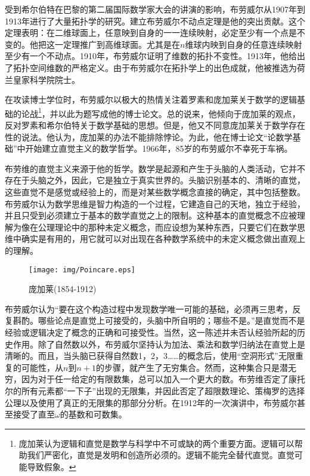 \documentclass{article}
\begin{document}
受到希尔伯特在巴黎的第二届国际数学家大会的讲演的影响，布劳威尔从1907年到1913年进行了大量拓扑学的研究。建立布劳威尔不动点定理是他的突出贡献。这个定理表明：在二维球面上，任意映到自身的一一连续映射，必定至少有一个点是不变的。他把这一定理推广到高维球面。尤其是在$n$维球内映到自身的任意连续映射至少有一个不动点。1910年，布劳威尔证明了维数的拓扑不变性。1913年，他给出了拓扑空间维数的严格定义。由于布劳威尔在拓扑学上的出色成就，他被推选为荷兰皇家科学院院士。

在攻读博士学位时，布劳威尔以极大的热情关注着罗素和庞加莱关于数学的逻辑基础的论战\footnote{庞加莱认为逻辑和直觉是数学与科学中不可或缺的两个重要方面。逻辑可以帮助我们严密化，直觉是发明和创造所必须的。逻辑不能完全替代直觉。直觉可能导致假象\cite{Poincare2}。}，并以此为题写成他的博士论文。总的说来，他倾向于庞加莱的观点，反对罗素和希尔伯特关于数学基础的思想。但是，他又不同意庞加莱关于数学存在性的说法。他认为，庞加莱的办法不能排除悖论。为此，他在博士论文“论数学基础”中开始建立直觉主义的数学哲学。1966年，85岁的布劳威尔不幸死于车祸。

布劳维的直觉主义来源于他的哲学。数学是起源和产生于头脑的人类活动，它并不存在于头脑之外，因此，它是独立于真实世界的。头脑识别基本的、清晰的直觉，这些直觉不是感觉或经验上的，而是对某些数学概念直接的确定，其中包括整数。布劳威尔认为数学思维是智力构造的一个过程，它建造自己的天地，独立于经验，并且只受到必须建立于基本的数学直觉之上的限制。这种基本的直觉概念不应被理解为像在公理理论中的那种未定义概念，而应设想为某种东西，只要它们在数学思维中确实是有用的，用它就可以对出现在各种数学系统中的未定义概念做出直观上的理解。

\begin{wrapfigure}{R}{0.3\textwidth}
 \centering
 \texttt{[image: img/Poincare.eps]}
 \captionsetup{labelformat=empty}
 \caption{庞加莱(1854-1912)}
 \label{fig:Poincare}
\end{wrapfigure}

布劳威尔认为“要在这个构造过程中发现数学唯一可能的基础，必须再三思考，反复斟酌。哪些论点是直觉上可接受的，头脑中所自明的；哪些不是。”是直觉而不是经验或逻辑决定了概念的正确和可接受性。当然，这一陈述并未否认经验所起的历史作用。除了自然数以外，布劳威尔坚持认为加法、乘法和数学归纳法在直觉上是清晰的。而且，当头脑已获得自然数1，2，3……的概念后，使用“空洞形式”无限重复的可能性，从$n$到$n+1$的步骤，就产生了无穷集合。然而，这种集合只是潜无穷，因为对于任一给定的有限数集，总可以加入一个更大的数。布劳维否定了康托尔的所有元素都“一下子”出现的无限集，并因此否定了超限数理论、策梅罗的选择公理以及使用了真正的无限集的那部分分析。在1912年的一次演讲中，布劳威尔甚至接受了直至$\omega$的基数和可数集。
\end{document}
